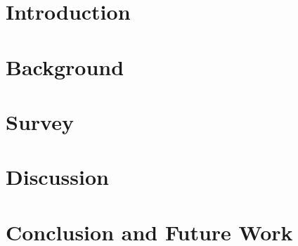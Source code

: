 \section{Introduction}



\section{Background}
\label{sec:background}



\section{Survey}
\label{sec:survey}



\section{Discussion}\label{sec:discussion}



\section{Conclusion and Future Work}\label{sec:conclusion}

